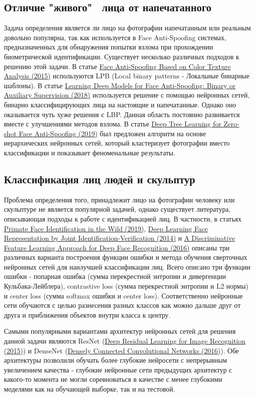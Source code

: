 \documentclass[a4paper,14pt]{extarticle}
\newcommand{\bibref}[3]{\hyperlink{#1}{#2 (#3)}} %
\begin{document}
    \subsection{Отличие "живого" \, лица от напечатанного}
    Задача определения является ли лицо на фотографии напечатанным или реальным довольно популярна, так как используется в Face Anti-Spoofing системах, предназначенных для обнаружения попытки взлома при прохождении биометрической идентификации. Существует несколько различных подходов к решению этой задачи. В статье \bibref{lbp}{Face Anti-Spoofing Based on Color Texture Analysis}{2015} используются LPB (Local binary patterns - Локальные бинарные шаблоны). В статье \bibref{lbp2}{Learning Deep Models for Face Anti-Spoofing: Binary or Auxiliary Supervision}{2018} используется решение с помощью нейронных сетей, бинарно классифицирующих лица на настоящие и напечатанные. Однако оно оказывается чуть хуже решения с LBP. Данная область постоянно развивается вместе с улучшениями методов взлома. В статье \bibref{lbp3}{Deep Tree Learning for Zero-shot Face Anti-Spoofing}{2019} был предложен алгоритм на основе иерархических нейронных сетей, который кластеризует фотографии вместо классификации и показывает феноменальные результаты.
    \subsection{Классификация лиц людей и скульптур}
    Проблема определения того, принадлежит лицо на фотографии человеку или скульптуре не является популярной задачей, однако существует литература, описывающая подходы к работе с идентификацией лиц. В частности, в статьях \bibref{pfid}{Primate Face Identification in the Wild}{2019}, \bibref{pfid2}{Deep Learning Face Representation by Joint Identification-Verification}{2014} и \bibref{pfid3}{A Discriminative Feature Learning Approach
    for Deep Face Recognition}{2016} описаны три различных варианта построения функции ошибки и метода обучения сверточных нейронных сетей для наилучшей классификации лиц. Всего описано три функции ошибки - попарная ошибка (сумма перекрестной энтропии и дивергенции Кульбака-Лейблера), contrastive loss (сумма перекрестной энтропии и L2 нормы) и center loss (сумма softmax ошибки и center loss). Соответственно нейронные сети обучаются с целью разнесения разных классов как можно дальше друг от друга и приближения объектов внутри класса к центру.
    \par Самыми популярными вариантами архитектур нейронных сетей для решения данной задачи являются ResNet (\bibref{resnet}{Deep Residual Learning for Image Recognition}{2015}) и DenseNet (\bibref{densenet}{Densely Connected Convolutional Networks}{2016}). Обе архитектуры позволили обучать более глубокие нейросети с непрерывным увеличением качества - глубокие нейронные сети предыдущих архитектур с какого-то момента не могли соревноваться в качестве с менее глубокими моделями как на обучающей выборке, так и на тестовой.
\end{document}
